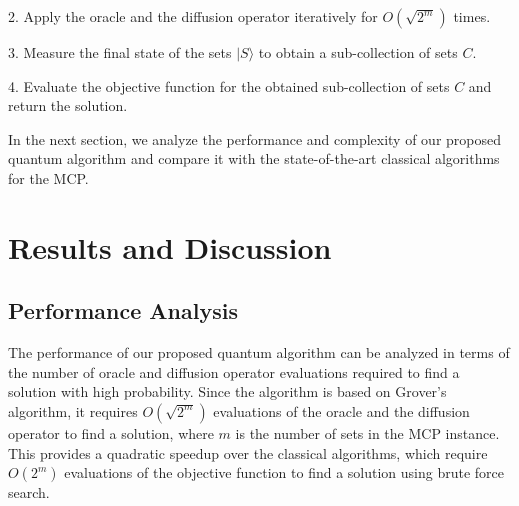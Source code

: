 2. Apply the oracle and the diffusion operator iteratively for $O(\sqrt{2^m})$ times.

3. Measure the final state of the sets $|S\rangle$ to obtain a sub-collection of sets $C$.

4. Evaluate the objective function for the obtained sub-collection of sets $C$ and return the solution.

In the next section, we analyze the performance and complexity of our proposed quantum algorithm and compare it with the state-of-the-art classical algorithms for the MCP.

\section{Results and Discussion}\label{sec:results}

\subsection{Performance Analysis}

The performance of our proposed quantum algorithm can be analyzed in terms of the number of oracle and diffusion operator evaluations required to find a solution with high probability. Since the algorithm is based on Grover's algorithm, it requires $O(\sqrt{2^m})$ evaluations of the oracle and the diffusion operator to find a solution, where $m$ is the number of sets in the MCP instance. This provides a quadratic speedup over the classical algorithms, which require $O(2^m)$ evaluations of the objective function to find a solution using brute force search.

